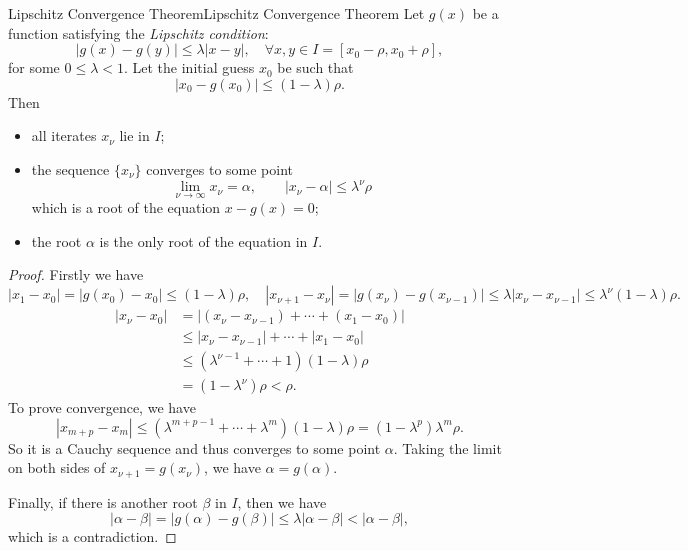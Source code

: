 \documentclass[../main.tex]{subfiles}
\begin{document}
\begin{theorem}{Lipschitz Convergence Theorem}{Lipschitz Convergence Theorem}
	Let $g(x)$ be a function satisfying the \emph{Lipschitz condition}:
	\begin{equation}
		|g(x) - g(y)| \leq \lambda |x - y|, \quad \forall x, y \in I = [x_0 - \rho, x_0 + \rho],
	\end{equation}
	for some $0 \leq \lambda < 1$. Let the initial guess $x_0$ be such that
	\begin{equation}
		|x_0 - g(x_0)| \leq (1 - \lambda) \rho.
	\end{equation}
	Then
	\begin{itemize}
		\item all iterates $x_\nu$ lie in $I$;
		\item the sequence $\{x_\nu\}$ converges to some point
		      \begin{equation*}
			      \lim_{\nu \to \infty } x_\nu = \alpha, \qquad |x_\nu - \alpha| \leq \lambda^\nu \rho
		      \end{equation*}
		      which is a root of the equation $x - g(x) = 0$;
		\item the root $\alpha$ is the only root of the equation in $I$.
	\end{itemize}
\end{theorem}
\begin{proof}
	Firstly we have
	\begin{equation*}
		|x_1 - x_0| = |g(x_0) - x_0| \leq (1 - \lambda) \rho, \quad |x_{\nu+1} - x_\nu| = |g(x_\nu) - g(x_{\nu-1})| \leq \lambda |x_\nu - x_{\nu-1}| \leq \lambda^\nu (1 - \lambda) \rho.
	\end{equation*}
	\begin{equation*}
		\begin{aligned}
			|x_{\nu} - x_0| & = |(x_{\nu} - x_{\nu-1}) + \cdots + (x_1 - x_0)|      \\
			                & \leq |x_{\nu} - x_{\nu-1}| + \cdots + |x_1 - x_0|     \\
			                & \leq (\lambda^{\nu-1} + \cdots + 1)(1 - \lambda) \rho \\
			                & = (1 - \lambda^\nu) \rho < \rho.
		\end{aligned}
	\end{equation*}
	To prove convergence, we have
	\begin{equation*}
		|x_{m+p} - x_m| \leq (\lambda^{m+p-1} + \cdots + \lambda^m)(1 - \lambda) \rho = (1 - \lambda^p) \lambda^m \rho.
	\end{equation*}
	So it is a Cauchy sequence and thus converges to some point $\alpha$. Taking the limit on both sides of $x_{\nu+1} = g(x_\nu)$, we have $\alpha = g(\alpha)$.

	Finally, if there is another root $\beta$ in $I$, then we have
	\begin{equation*}
		|\alpha - \beta| = |g(\alpha) - g(\beta)| \leq \lambda |\alpha - \beta| < |\alpha - \beta|,
	\end{equation*}
	which is a contradiction.
\end{proof}
\end{document}
